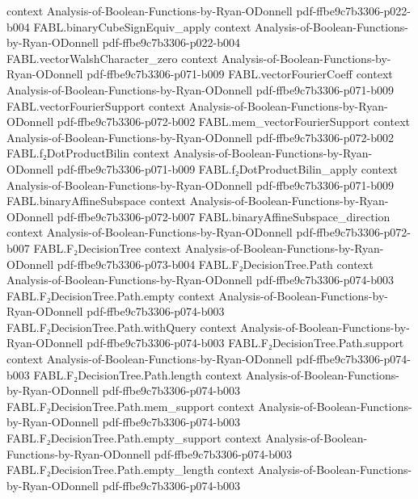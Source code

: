 \begin{theorem}
  {context}
  {Analysis-of-Boolean-Functions-by-Ryan-ODonnell}
  {pdf-ffbe9c7b3306-p022-b004}
\proofstep
  {FABL.binaryCubeSignEquiv_apply}
  {context}
  {Analysis-of-Boolean-Functions-by-Ryan-ODonnell}
  {pdf-ffbe9c7b3306-p022-b004}
\proofstep
  {FABL.vectorWalshCharacter_zero}
  {context}
  {Analysis-of-Boolean-Functions-by-Ryan-ODonnell}
  {pdf-ffbe9c7b3306-p071-b009}
\proofstep
  {FABL.vectorFourierCoeff}
  {context}
  {Analysis-of-Boolean-Functions-by-Ryan-ODonnell}
  {pdf-ffbe9c7b3306-p071-b009}
\proofstep
  {FABL.vectorFourierSupport}
  {context}
  {Analysis-of-Boolean-Functions-by-Ryan-ODonnell}
  {pdf-ffbe9c7b3306-p072-b002}
\proofstep
  {FABL.mem_vectorFourierSupport}
  {context}
  {Analysis-of-Boolean-Functions-by-Ryan-ODonnell}
  {pdf-ffbe9c7b3306-p072-b002}
\proofstep
  {FABL.f₂DotProductBilin}
  {context}
  {Analysis-of-Boolean-Functions-by-Ryan-ODonnell}
  {pdf-ffbe9c7b3306-p071-b009}
\proofstep
  {FABL.f₂DotProductBilin_apply}
  {context}
  {Analysis-of-Boolean-Functions-by-Ryan-ODonnell}
  {pdf-ffbe9c7b3306-p071-b009}
\proofstep
  {FABL.binaryAffineSubspace}
  {context}
  {Analysis-of-Boolean-Functions-by-Ryan-ODonnell}
  {pdf-ffbe9c7b3306-p072-b007}
\proofstep
  {FABL.binaryAffineSubspace_direction}
  {context}
  {Analysis-of-Boolean-Functions-by-Ryan-ODonnell}
  {pdf-ffbe9c7b3306-p072-b007}
\proofstep
  {FABL.F₂DecisionTree}
  {context}
  {Analysis-of-Boolean-Functions-by-Ryan-ODonnell}
  {pdf-ffbe9c7b3306-p073-b004}
\proofstep
  {FABL.F₂DecisionTree.Path}
  {context}
  {Analysis-of-Boolean-Functions-by-Ryan-ODonnell}
  {pdf-ffbe9c7b3306-p074-b003}
\proofstep
  {FABL.F₂DecisionTree.Path.empty}
  {context}
  {Analysis-of-Boolean-Functions-by-Ryan-ODonnell}
  {pdf-ffbe9c7b3306-p074-b003}
\proofstep
  {FABL.F₂DecisionTree.Path.withQuery}
  {context}
  {Analysis-of-Boolean-Functions-by-Ryan-ODonnell}
  {pdf-ffbe9c7b3306-p074-b003}
\proofstep
  {FABL.F₂DecisionTree.Path.support}
  {context}
  {Analysis-of-Boolean-Functions-by-Ryan-ODonnell}
  {pdf-ffbe9c7b3306-p074-b003}
\proofstep
  {FABL.F₂DecisionTree.Path.length}
  {context}
  {Analysis-of-Boolean-Functions-by-Ryan-ODonnell}
  {pdf-ffbe9c7b3306-p074-b003}
\proofstep
  {FABL.F₂DecisionTree.Path.mem_support}
  {context}
  {Analysis-of-Boolean-Functions-by-Ryan-ODonnell}
  {pdf-ffbe9c7b3306-p074-b003}
\proofstep
  {FABL.F₂DecisionTree.Path.empty_support}
  {context}
  {Analysis-of-Boolean-Functions-by-Ryan-ODonnell}
  {pdf-ffbe9c7b3306-p074-b003}
\proofstep
  {FABL.F₂DecisionTree.Path.empty_length}
  {context}
  {Analysis-of-Boolean-Functions-by-Ryan-ODonnell}
  {pdf-ffbe9c7b3306-p074-b003}

\end{theorem}
